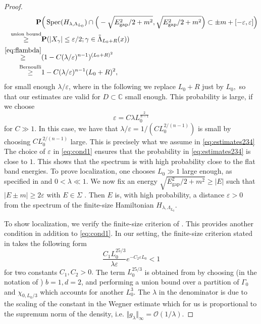 \documentclass[reqno,12pt,letterpaper]{amsart}
\numberwithin{equation}{section}
\DeclareMathOperator{\Spec}{Spec}
\begin{document}
{\begin{proof}
\begin{equation}
\label{eq:estimates234}
 \begin{split}
\mathbf P&\Big( \Spec(H_{\lambda,\Lambda_{L_0}} ) \cap \Big(-\sqrt{E_{\operatorname{gap}}^2/2+m^2},\sqrt{E_{\operatorname{gap}}^2/2+m^2}\Big) \subset \pm m+ [-\varepsilon,\varepsilon]\Big) \\
\overset{\text{union bound}}{\ge} &\mathbf P(\vert X_{\gamma}\vert \le \varepsilon/2; \gamma \in \tilde \Lambda_{L_0+R}(x) )  \\
\overset{\eqref{eq:flambda}}{\ge} &(1-C(\lambda/ \varepsilon)^{n-1})^{(L_0+R)^2} \\
\overset{\text{Bernoulli}}{\ge} &1- C (\lambda/ \varepsilon)^{n-1}{(L_0+R)^2},
\end{split}
\end{equation}
for small enough $\lambda/\varepsilon${, where in the following we replace $L_0+R$ just by $L_0,$ so that our estimates are valid for $D \subset \mathbb C$ small enough.}
This probability is large, if we choose 
\begin{equation}
\label{eq:cond1}
\varepsilon =C \lambda L_0^{\frac{2}{n-1}}
\end{equation}
for $C\gg 1.$ In this case, we have that $\lambda/\varepsilon = 1/(C L_0^{2/(n-1)})$ is small by choosing $C L_0^{2/(n-1)}$ large. This is precisely what we assume in \eqref{eq:estimates234} 
The choice of $\varepsilon$ in \eqref{eq:cond1} ensures that the probability in \eqref{eq:estimates234} is close to $1$. This shows that the spectrum is with high probability close to the flat band energies.
 To prove localization, one chooses $L_0 \gg 1$ large enough, as specified in \cite[(2.16)]{GK02} and $0<\lambda \ll 1$. 
We now fix an energy $\sqrt{E_{\operatorname{gap}}^2/2+m^2} \ge \vert E \vert $ such that $\vert E \pm m \vert \ge 2 \varepsilon$ with $E \in \Sigma$ . Then $E$ is, with high probability, a distance $\varepsilon>0$ from the spectrum of the finite-size Hamiltonian $H_{\lambda,\Lambda_{L_0}}$. 

To show localization, we verify the finite-size criterion of \cite[Theorem $2.4$]{GK02}. This provides another condition in addition to \eqref{eq:cond1}. In our setting, the finite-size criterion stated in \cite[Theorem $2.4$, (2.17)]{GK02} takes the following form
\begin{equation}
\label{eq:cond2}
 \frac{C_1 L_0^{25/3}}{\lambda \varepsilon}e^{-C_2 \varepsilon L_0} <1
 \end{equation}
 for two constants $C_1,C_2>0.$
 The term $L_0^{25/3}$ is obtained from \cite[Theorem $2.4$]{GK02}  by choosing (in the notation of \cite{GK02}) $b=1, d=2$, and performing a union bound over a partition of $\Gamma_0$ and $\chi_{0,L_0/3}$ which accounts for another $L_0^3.$ The $\lambda$ in the denominator is due to the scaling of the constant in the Wegner estimate which for us is proportional to the supremum norm of the density, i.e. $\Vert g_{\lambda}\Vert_{\infty} = \mathcal O(1/\lambda)$. 
 

\end{proof}}
\end{document}
